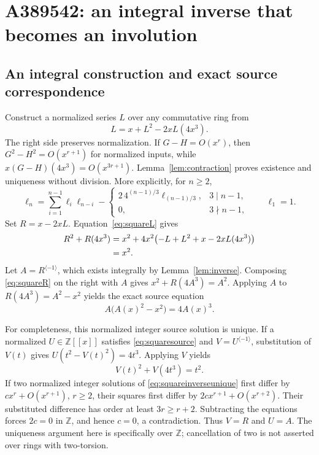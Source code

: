 \documentclass[11pt,a4paper]{article}
\theoremstyle{remark}
\newcommand{\Z}{\mathbb Z}
\newcommand{\ps}[1]{#1[[x]]}
\newcommand{\rev}{^{\langle-1\rangle}}
\begin{document}
\section{A389542: an integral inverse that becomes an involution}

\subsection{An integral construction and exact source correspondence}

Construct a normalized series $L$ over any commutative ring from
\begin{equation}\label{eq:squareL}
 L=x+L^2-2xL(4x^3).
\end{equation}
The right side preserves normalization. If $G-H=O(x^r)$, then
$G^2-H^2=O(x^{r+1})$ for normalized inputs, while
$x(G-H)(4x^3)=O(x^{3r+1})$. Lemma~\ref{lem:contraction} proves
existence and uniqueness without division. More explicitly, for $n\ge2$,
\[
 \ell_n=\sum_{i=1}^{n-1}\ell_i\ell_{n-i}
 -\begin{cases}
  2\,4^{(n-1)/3}\ell_{(n-1)/3},&3\mid n-1,\\
  0,&3\nmid n-1,
 \end{cases}
 \qquad \ell_1=1.
\]
Set $R=x-2xL$. Equation~\eqref{eq:squareL} gives
\begin{align}
 R^2+R(4x^3)
 &=x^2+4x^2\bigl(-L+L^2+x-2xL(4x^3)\bigr)\notag\\
 &=x^2.\label{eq:squareR}
\end{align}
Let $A=R\rev$, which exists integrally by Lemma~\ref{lem:inverse}.
Composing \eqref{eq:squareR} on the right with $A$ gives
$x^2+R(4A^3)=A^2$. Applying $A$ to $R(4A^3)=A^2-x^2$ yields
the exact source equation
\begin{equation}\label{eq:squaresource}
 A\bigl(A(x)^2-x^2\bigr)=4A(x)^3.
\end{equation}

For completeness, this normalized integer source solution is unique.
If a normalized $U\in\ps{\Z}$ satisfies \eqref{eq:squaresource} and
$V=U\rev$, substitution of $V(t)$ gives
$U(t^2-V(t)^2)=4t^3$. Applying $V$ yields
\begin{equation}\label{eq:squareinverseunique}
 V(t)^2+V(4t^3)=t^2.
\end{equation}
If two normalized integer solutions of \eqref{eq:squareinverseunique}
first differ by $c x^r+O(x^{r+1})$, $r\ge2$, their squares first differ
by $2c x^{r+1}+O(x^{r+2})$. Their substituted difference has order at
least $3r\ge r+2$. Subtracting the equations forces $2c=0$ in $\Z$,
and hence $c=0$, a contradiction. Thus $V=R$ and $U=A$.
The uniqueness argument here is specifically over $\Z$; cancellation of
two is not asserted over rings with two-torsion.
\end{document}
